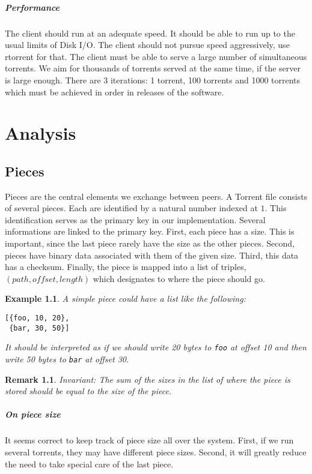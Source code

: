 \documentclass[a4paper]{memoir}
\newtheorem{example}{Example}
\newtheorem{remark}{Remark}
\begin{document}
\paragraph{Performance} The client should run at an adequate speed. It
should be able to run up to the usual limits of Disk I/O. The client
should not pursue speed aggressively, use rtorrent for that. The
client must be able to serve a large number of simultaneous
torrents. We aim for thousands of torrents served at the same time, if
the server is large enough. There are 3 iterations: 1 torrent, 100
torrents and 1000 torrents which must be achieved in order in
releases of the software.

\chapter{Analysis}
\section{Pieces}
Pieces are the central elements we exchange between peers. A Torrent
file consists of several pieces. Each are identified by a natural
number indexed at $1$. This identification serves as the primary key
in our implementation. Several informations are linked to the primary
key. First, each piece has a size. This is important, since the last
piece rarely have the size as the other pieces. Second, pieces have
binary data associated with them of the given size. Third, this data
has a checksum. Finally, the piece is mapped into a list of triples,
$(path, offset, length)$ which designates to where the piece should
go.
\begin{example}
  A simple piece could have a list like the following:
\begin{verbatim}
[{foo, 10, 20},
 {bar, 30, 50}]
\end{verbatim}
It should be interpreted as if we should write 20 bytes to
\texttt{foo} at offset 10 and then write 50 bytes to \texttt{bar} at
offset 30.
\end{example}
\begin{remark}
  Invariant: The sum of the sizes in the list of where the piece is
  stored should be equal to the size of the piece.
\end{remark}

\paragraph{On piece size}
It seems correct to keep track of piece size all over the
system. First, if we run several torrents, they may have different
piece sizes. Second, it will greatly reduce the need to take special
care of the last piece.
\end{document}
